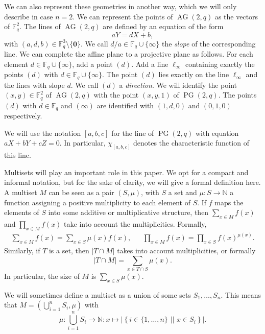 \documentclass[12pt, a4paper]{article}
\theoremstyle{definition}
\newtheorem{rmk}[thm]{Remark}
\newcommand{\FF}{\mathbb F}
\newcommand{\NN}{\mathbb N}
\newcommand{\sett}[2]{ \left\{ #1 \, \, || \, \, #2 \right \} }
\newcommand{\zero}{\mathbf 0}
\newcommand{\fqi}{\FF_q \cup \{\infty\}}
\DeclareMathOperator{\PG}{PG}
\newcommand{\pg}{\PG}
\DeclareMathOperator{\AG}{AG}
\newcommand{\ag}{\AG}
\begin{document}
 We can also represent these geometries in another way, which we will only describe in case $n=2$.
 We can represent the points of $\ag(2,q)$ as the vectors of $\FF_q^2$.
 The lines of $\ag(2,q)$ are defined by an equation of the form
 \[
  a Y = d X + b,
 \]
 with $(a,d,b) \in \FF_q^3 \setminus \{\zero\}$.
 We call $d/a \in \fqi$ the \emph{slope} of the corresponding line.
 We can complete the affine plane to a projective plane as follows.
 For each element $d \in \fqi$, add a point $(d)$.
 Add a line $\ell_\infty$ containing exactly the points $(d)$ with $d \in \fqi$.
 The point $(d)$ lies exactly on the line $\ell_\infty$ and the lines with slope $d$.
 We call $(d)$ a \emph{direction}.
 We will identify the point $(x,y) \in \FF_q^2$ of $\ag(2,q)$ with the point $(x,y,1)$ of $\pg(2,q)$.
 The points $(d)$ with $d \in \FF_q$ and $(\infty)$ are identified with $(1,d,0)$ and $(0,1,0)$ respectively.

 We will use the notation $[a,b,c]$ for the line of $\pg(2,q)$ with equation $aX + bY + cZ = 0$.
 In particular, $\chi_{[a,b,c]}$ denotes the characteristic function of this line.


 \bigskip

 Multisets will play an important role in this paper.
 We opt for a compact and informal notation, but for the sake of clarity, we will give a formal definition here.
 A multiset $M$ can be seen as a pair $(S,\mu)$, with $S$ a set and $\mu: S \to \NN$ a function assigning a positive multiplicity to each element of $S$.
 If $f$ maps the elements of $S$ into some additive or multiplicative structure, then $\sum_{x \in M} f(x)$ and $\prod_{x \in M} f(x)$ take into account the multiplicities.
 Formally,
 \begin{align*}
  \sum_{x \in M} f(x) = \sum_{x \in S} \mu(x) f(x), &&
  \prod_{x \in M} f(x) = \prod_{x \in S} f(x)^{\mu(x)}.
 \end{align*}
 Similarly, if $T$ is a set, then $|T \cap M|$ takes into account multiplicities, or formally
 \[
  |T \cap M| = \sum_{x \in T \cap S} \mu(x).
 \]
 In particular, the size of $M$ is $\sum_{x \in S} \mu(x)$.
 
 We will sometimes define a multiset as a union of some sets $S_1, \dots, S_n$.
 This means that $M = (\bigcup_{i=1}^n S_i, \mu)$ with
 \[
  \mu: \bigcup_{i=1}^n S_i \to \NN: x \mapsto |\sett{i \in \{1, \dots, n\}}{x \in S_i}|.
 \]
\end{document}
